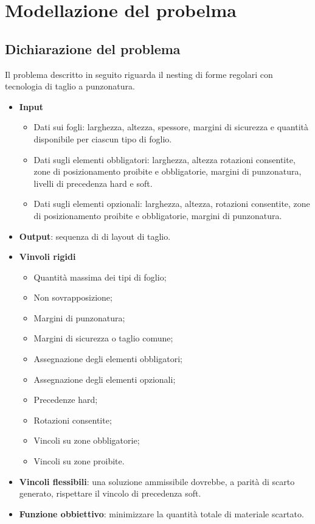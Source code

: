 \chapter{Modellazione del probelma}
\label{cap:analisi-requisiti}


\section{Dichiarazione del problema}

Il problema descritto in seguito riguarda il nesting di forme regolari con tecnologia di taglio a punzonatura.

\begin{itemize}
    \item \textbf{Input}
    \begin{itemize}
        \item Dati sui fogli: larghezza, altezza, spessore, margini di sicurezza e quantità disponibile per ciascun tipo di foglio.
        \item Dati sugli elementi obbligatori: larghezza, altezza rotazioni consentite, zone di posizionamento proibite e obbligatorie, margini di punzonatura, livelli di precedenza hard e soft.
        \item Dati sugli elementi opzionali: larghezza, altezza, rotazioni consentite, zone di posizionamento proibite e obbligatorie, margini di punzonatura.
    \end{itemize}
    \item \textbf{Output}: sequenza di di layout di taglio.
    \item \textbf{Vinvoli rigidi}
    \begin{itemize}
        \item Quantità massima dei tipi di foglio;
        \item Non sovrapposizione;
        \item Margini di punzonatura;
        \item Margini di sicurezza o taglio comune;
        \item Assegnazione degli elementi obbligatori;
        \item Assegnazione degli elementi opzionali;
        \item Precedenze hard;
        \item Rotazioni consentite;
        \item Vincoli su zone obbligatorie;
        \item Vincoli su zone proibite.
    \end{itemize}
    \item \textbf{Vincoli flessibili}: una soluzione ammissibile dovrebbe, a parità di scarto generato, rispettare il vincolo di precedenza soft.
    \item \textbf{Funzione obbiettivo}: minimizzare la quantità totale di materiale scartato.
\end{itemize}

